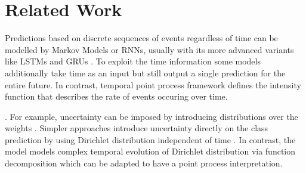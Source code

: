 \section{Related Work}

Predictions based on discrete sequences of events regardless of time can be modelled by Markov Models \cite{MarkovModel1} or RNNs, usually with its more advanced variants like LSTMs \cite{LSTM} and GRUs \cite{GRU}. To exploit the time information some models \cite{TimeDependentRNN, PhasedLstm} additionally take time as an input but still output a single prediction for the entire future. In contrast, temporal point process framework defines the intensity function that describes the rate of events occuring over time.




. For example, uncertainty can be imposed by introducing distributions over the weights \cite{WeightUncertainty, BayesianRNNForecastingUncertainty, LaplaceNN}. Simpler approaches introduce uncertainty directly on the class prediction by using Dirichlet distribution independent of time \cite{PriorNetworks, NNRBetaDir}. In contrast, the \DirModel model models complex temporal evolution of Dirichlet distribution via function decomposition which can be adapted to have a point process interpretation.

